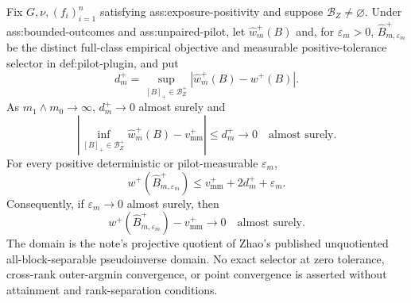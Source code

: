 Fix \(G,\nu,(f_i)_{i=1}^n\) satisfying ass:exposure-positivity and suppose \(\mathcal B_Z\ne\varnothing\).  Under ass:bounded-outcomes and ass:unpaired-pilot, let \(\widehat w_m^+(B)\) and, for \(\varepsilon_m>0\), \(\widehat B_{m,\varepsilon_m}^+\) be the distinct full-class empirical objective and measurable positive-tolerance selector in def:pilot-plugin, and put
\[
d_m^+=\sup_{[B]_+\in\mathcal B_Z^+}|\widehat w_m^+(B)-w^+(B)|.
\]
As \(m_1\wedge m_0\to\infty\), \(d_m^+\to0\) almost surely and
\[
\left|\inf_{[B]_+\in\mathcal B_Z^+}\widehat w_m^+(B)-v_{\mathrm{mm}}^+\right|
\le d_m^+\longrightarrow0
\quad\text{almost surely}.
\]
For every positive deterministic or pilot-measurable \(\varepsilon_m\),
\[
w^+(\widehat B_{m,\varepsilon_m}^+)
\le v_{\mathrm{mm}}^++2d_m^++\varepsilon_m.
\]
Consequently, if \(\varepsilon_m\to0\) almost surely, then
\[
w^+(\widehat B_{m,\varepsilon_m}^+)-v_{\mathrm{mm}}^+\longrightarrow0
\quad\text{almost surely}.
\]
The domain is the note's projective quotient of Zhao's published unquotiented all-block-separable pseudoinverse domain.  No exact selector at zero tolerance, cross-rank outer-argmin convergence, or point convergence is asserted without attainment and rank-separation conditions.